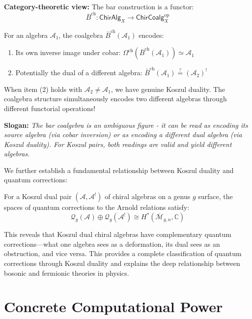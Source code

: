 \begin{remark}
\textbf{Category-theoretic view:} The bar construction is a functor:
$$\bar{B}^{\text{ch}}: \mathsf{ChirAlg}_X \to \mathsf{ChirCoalg}_X^{\text{op}}$$

For an algebra $\mathcal{A}_1$, the coalgebra $\bar{B}^{\text{ch}}(\mathcal{A}_1)$ encodes:
\begin{enumerate}
\item Its own inverse image under cobar: $\Omega^{\text{ch}}(\bar{B}^{\text{ch}}(\mathcal{A}_1)) \simeq \mathcal{A}_1$
\item Potentially the dual of a different algebra: $\bar{B}^{\text{ch}}(\mathcal{A}_1) \stackrel{?}{=} (\mathcal{A}_2)^!$
\end{enumerate}

When item (2) holds with $\mathcal{A}_2 \neq \mathcal{A}_1$, we have genuine Koszul duality. The coalgebra structure simultaneously encodes two different algebras through different functorial operations!

\textbf{Slogan:} \emph{The bar coalgebra is an ambiguous figure - it can be read as encoding its source algebra (via cobar inversion) or as encoding a different dual algebra (via Koszul duality). For Koszul pairs, both readings are valid and yield different algebras.}
\end{remark}


We further establish a fundamental relationship between Koszul duality and quantum corrections:

\begin{theorem}
For a Koszul dual pair $(\mathcal{A}, \mathcal{A}^!)$ of chiral algebras on a genus $g$ surface, the spaces of quantum corrections to the Arnold relations satisfy:
$$\mathcal{Q}_g(\mathcal{A}) \oplus \mathcal{Q}_g(\mathcal{A}^!) \cong H^*(\overline{\mathcal{M}}_{g,n}, \mathbb{C})$$
\end{theorem}

This reveals that Koszul dual chiral algebras have complementary quantum corrections—what one algebra sees as a deformation, its dual sees as an obstruction, and vice versa. This provides a complete classification of quantum corrections through Koszul duality and explains the deep relationship between bosonic and fermionic theories in physics.



\section{Concrete Computational Power}

